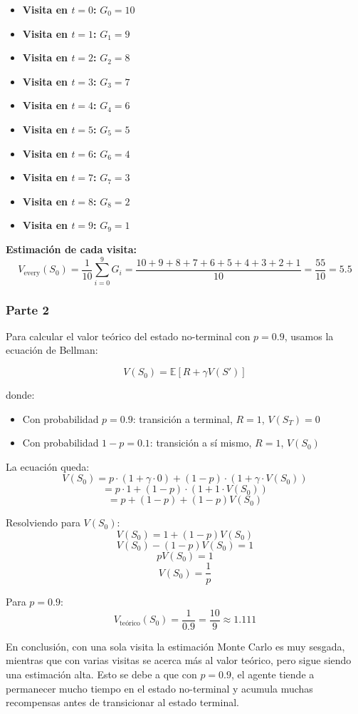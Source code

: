 \documentclass[12pt,a4paper]{article}
\begin{document}
\begin{itemize}
    \item \textbf{Visita en $t=0$:} $G_0 = 10$
    \item \textbf{Visita en $t=1$:} $G_1 = 9$
    \item \textbf{Visita en $t=2$:} $G_2 = 8$
    \item \textbf{Visita en $t=3$:} $G_3 = 7$
    \item \textbf{Visita en $t=4$:} $G_4 = 6$
    \item \textbf{Visita en $t=5$:} $G_5 = 5$
    \item \textbf{Visita en $t=6$:} $G_6 = 4$
    \item \textbf{Visita en $t=7$:} $G_7 = 3$
    \item \textbf{Visita en $t=8$:} $G_8 = 2$
    \item \textbf{Visita en $t=9$:} $G_9 = 1$
\end{itemize}

\textbf{Estimación de cada visita:}
$$V_{\text{every}}(S_0) = \frac{1}{10}\sum_{i=0}^{9} G_i = \frac{10 + 9 + 8 + 7 + 6 + 5 + 4 + 3 + 2 + 1}{10} = \frac{55}{10} = 5.5$$

\subsubsection{Parte 2}

Para calcular el valor teórico del estado no-terminal con $p = 0.9$, usamos la ecuación de Bellman:

$$V(S_0) = \mathbb{E}[R + \gamma V(S')]$$

donde:
\begin{itemize}
    \item Con probabilidad $p = 0.9$: transición a terminal, $R=1$, $V(S_T) = 0$
    \item Con probabilidad $1-p = 0.1$: transición a sí mismo, $R=1$, $V(S_0)$
\end{itemize}

La ecuación queda:
$$V(S_0) = p \cdot (1 + \gamma \cdot 0) + (1-p) \cdot (1 + \gamma \cdot V(S_0))$$
$$= p \cdot 1 + (1-p) \cdot (1 + 1 \cdot V(S_0))$$
$$= p + (1-p) + (1-p)V(S_0)$$

Resolviendo para $V(S_0)$:
$$V(S_0) = 1 + (1-p)V(S_0)$$
$$V(S_0) - (1-p)V(S_0) = 1$$
$$pV(S_0) = 1$$
$$V(S_0) = \frac{1}{p}$$

Para $p = 0.9$:
$$V_{\text{teórico}}(S_0) = \frac{1}{0.9} = \frac{10}{9} \approx 1.111$$

En conclusión, con una sola visita la estimación Monte Carlo es muy sesgada, mientras
que con varias visitas se acerca más al valor teórico, pero sigue siendo una
estimación alta. Esto se debe a que con $p=0.9$, el agente tiende a permanecer
mucho tiempo en el estado no-terminal y acumula muchas recompensas antes de
transicionar al estado terminal. %
\end{document}
